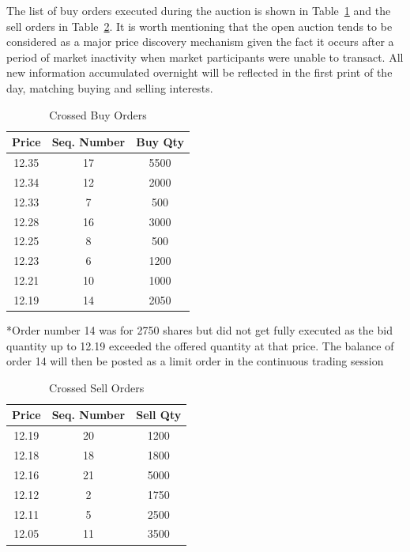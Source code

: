 The list of buy orders executed during the auction is shown in Table~\ref{tab:openAuct4} and the sell orders in Table~\ref{tab:openAuct5}. It is worth mentioning that the open auction tends to be considered as a major price discovery mechanism given the fact it occurs after a period of market inactivity when market participants were unable to transact. All new information accumulated overnight will be reflected in the first print of the day, matching buying and selling interests.  

\begin{table}[!ht]
   \centering
   \caption{Crossed Buy Orders\label{tab:openAuct4}}
   \hspace*{-3.3cm}
   \begin{tabular}{ccc} 
	Price & Seq. Number & Buy Qty  \\ \hline
	12.35 &  17 & 5500 \\
	12.34 & 12 & 2000\\	
	12.33 & 7  & 500\\			
	12.28 &  16 & 3000\\	
	12.25 & 8 & 500\\	
	12.23 & 6 & 1200\\		
	12.21  & 10& 1000\\		
	12.19 &  14  & 2050 		
   \end{tabular}
\begin{minipage}[t]{1\textwidth}
\small{*Order number 14 was for 2750 shares but did not get fully executed as the bid quantity up to 12.19 exceeded the offered quantity at that price. The balance of order 14 will then be posted as a limit order in the continuous trading session}
\end{minipage}   
\end{table}

	
\begin{table}[!ht]
   \centering
   \caption{Crossed Sell Orders\label{tab:openAuct5}}
   \hspace*{-3.3cm}
   \begin{tabular}{ccc} 
	Price & Seq. Number & Sell Qty  \\ \hline
	12.19 &  20 & 1200 \\
	12.18 &  18 & 1800 \\
	12.16 &  21 & 5000 \\
	12.12 & 2 & 1750 \\		
	12.11 & 5 & 2500 \\				
	12.05 & 11 & 3500 		
   \end{tabular}
\end{table}	


